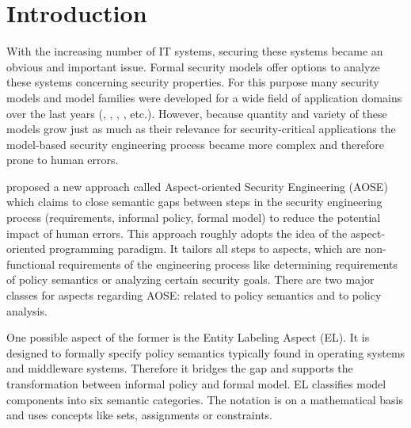 \documentclass[twoside, openright, 12pt]{book}
\begin{document}
\cleardoublepage
\listoffigures
{}


%







\cleardoublepage
{}
\chapter{Introduction}
\label{introduction}
With the increasing number of IT systems, securing these systems became an obvious and important issue.
Formal security models offer options to analyze these systems concerning security properties.
For this purpose many security models and model families were developed for a wide field of application domains over the last years (\cite{Lampson74}, \cite{Sandhu96}, \cite{Jin12}, \cite{Servos17}, etc.).
However, because quantity and variety of these models grow just as much as their relevance for security-critical applications the model-based security engineering process became more complex and therefore prone to human errors.

\citet*{Amthor18} proposed a new approach called Aspect-oriented Security Engineering (AOSE) which claims to close semantic gaps between steps in the security engineering process (requirements, informal policy, formal model) to reduce the potential impact of human errors.
This approach roughly adopts the idea of the aspect-oriented programming paradigm.
It tailors all steps to aspects, which are non-functional requirements of the engineering process like determining requirements of policy semantics or analyzing certain security goals.
There are two major classes for aspects regarding AOSE: related to policy semantics and to policy analysis.

One possible aspect of the former is the Entity Labeling Aspect (EL).
It is designed to formally specify policy semantics typically found in operating systems and middleware systems.
Therefore it bridges the gap and supports the transformation between informal policy and formal model.
EL classifies model components into six semantic categories.
The notation is on a mathematical basis and uses concepts like sets, assignments or constraints.
\end{document}
